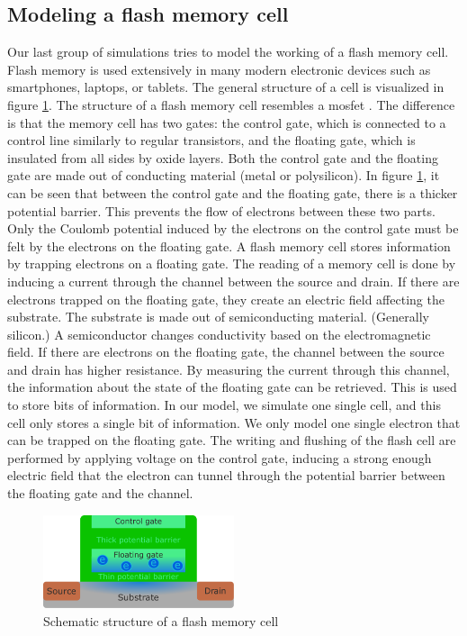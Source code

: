 \subsection{Modeling a flash memory cell}

Our last group of simulations tries to model the working of a flash memory cell.
Flash memory is used extensively in many modern electronic devices such as smartphones, laptops, or tablets.
The general structure of a cell is visualized in figure \ref{fig:flash_memory}.
The structure of a flash memory cell resembles a \acrfull{mosfet} \cite{Korec2011}.
The difference is that the memory cell has two gates: the control gate, which is connected to a control line similarly to regular transistors, and the floating gate, which is insulated from all sides by oxide layers.
Both the control gate and the floating gate are made out of conducting material (metal or polysilicon).
In figure \ref{fig:flash_memory}, it can be seen that between the control gate and the floating gate, there is a thicker potential barrier.
This prevents the flow of electrons between these two parts.
Only the Coulomb potential induced by the electrons on the control gate must be felt by the electrons on the floating gate.
A flash memory cell stores information by trapping electrons on a floating gate.
The reading of a memory cell is done by inducing a current through the channel between the source and drain.
If there are electrons trapped on the floating gate, they create an electric field affecting the substrate.
The substrate is made out of semiconducting material. (Generally silicon.)
A semiconductor changes conductivity based on the electromagnetic field.
If there are electrons on the floating gate, the channel between the source and drain has higher resistance.
By measuring the current through this channel, the information about the state of the floating gate can be retrieved.
This is used to store bits of information.
In our model, we simulate one single cell, and this cell only stores a single bit of information.
We only model one single electron that can be trapped on the floating gate.
The writing and flushing of the flash cell are performed by applying voltage on the control gate, inducing a strong enough electric field that the electron can tunnel through the potential barrier between the floating gate and the channel.
\begin{figure}
	\centering
	\includegraphics[width=0.5\textwidth]{figures/flash_memory.pdf}
	\caption{Schematic structure of a flash memory cell}
	\label{fig:flash_memory}
\end{figure}
